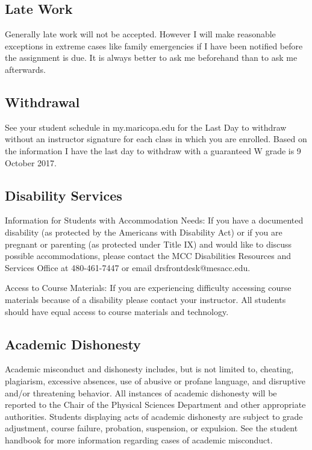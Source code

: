 \documentclass[12pt]{article}
\begin{document}
\subsection*{Late Work}
Generally late work will not be accepted. However I will make reasonable exceptions in extreme cases like family emergencies if I have been notified before the assignment is due. It is always better to ask me beforehand than to ask me afterwards.

\subsection*{Withdrawal}
See your student schedule in my.maricopa.edu for the Last Day to withdraw without an instructor signature for each class in which you are enrolled. Based on the information I have the last day to withdraw with a guaranteed W grade is 9 October 2017.

\subsection*{Disability Services}
Information for Students with Accommodation Needs:  If you have a documented disability (as protected by the Americans with Disability Act) or if you are pregnant or parenting (as protected under Title IX) and would like to discuss possible accommodations, please contact the MCC Disabilities Resources and Services Office at 480-461-7447 or email drsfrontdesk@mesacc.edu.

Access to Course Materials: If you are experiencing difficulty accessing course materials because of a disability please contact your instructor.  All students should have equal access to course materials and technology.

\subsection*{Academic Dishonesty}
Academic misconduct and dishonesty includes, but is not limited to, cheating, plagiarism, excessive absences, use of abusive or profane language, and disruptive and/or threatening behavior.  All instances of academic dishonesty will be reported to the Chair of the Physical Sciences Department and other appropriate authorities.  Students displaying acts of academic dishonesty are subject to grade adjustment, course failure, probation, suspension, or expulsion.  See the student handbook for more information regarding cases of academic misconduct.
\end{document}

